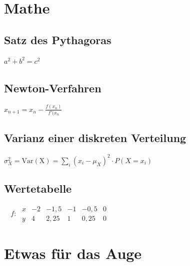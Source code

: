 \documentclass{scrreprt}
\begin{document}
	\chapter{Mathe}
	\label{cha:mathe}

		\section{Satz des Pythagoras} 

			\vspace{2pt}
			
			$ a^{2} + b^{2} = c^{2}
			\label{eq:pythagoras} $
			\vspace{10pt}
			\newline
		\section{Newton-Verfahren}

		\vspace{2pt}

			$ x_{n+1} = x_{n} - \frac{f(x_{n})}{f'(x_{n}} 
			\label{eq:newtonverfahren} $
			\vspace{10pt}
			\newline
		\section{Varianz einer diskreten Verteilung} 

			\vspace{2pt}

			$ \sigma^2_{X} = \mathrm{Var(X)} = \sum_i (x_i - \mu_{X})^2 \cdot P(X = x_i) \label{eq:varianzdiskret} $
			\vspace{10pt}
			\newline
		\section{Wertetabelle} 

		\vspace{2pt}

			$ \phantom{^{-1}}f\colon\; \begin{array}{r|c|c|c|c|c} x & -2 & -1,5 & -1 & -0,5 & 0 \\ \hline y & 4 & 2,25 & 1 & 0,25 & 0 \end{array} 
			\label{eq:wertetabelle} $

	\chapter{Etwas für das Auge}
\end{document}
